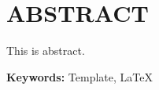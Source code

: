 \chapter{ABSTRACT}


This is abstract.


\vspace{1em}


{\noindent\textbf{Keywords:} Template, LaTeX
}








